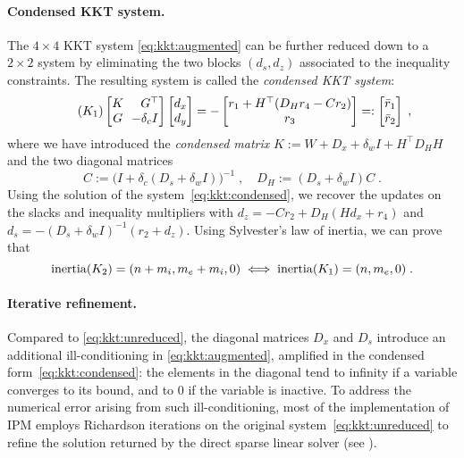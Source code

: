\paragraph{Condensed KKT system.}
The $4 \times 4$ KKT system \eqref{eq:kkt:augmented} can be further
reduced down to a $2 \times 2$ system by eliminating the two blocks
$(d_s, d_z)$ associated to the inequality constraints.
The resulting system is called the \emph{condensed KKT system}:
\begin{equation}
  \label{eq:kkt:condensed}
  \tag{$K_1$}
  \setlength\arraycolsep{3pt}
  \begin{bmatrix}
    K & \phantom{-} G^\top \\
    G & -\delta_c I
  \end{bmatrix}
  \begin{bmatrix}
    d_x \\ d_y
  \end{bmatrix}
  =
  -
  \begin{bmatrix}
    r_1 + H^\top(D_H r_4 - C r_2) \\ r_3
  \end{bmatrix}
  =:
  \begin{bmatrix}
    \bar{r}_1 \\ \bar{r}_2
  \end{bmatrix}
   \; ,
\end{equation}
where we have introduced the \emph{condensed matrix} $K := W + D_x + \delta_w I  + H^\top D_H H$
and the two diagonal matrices
\begin{equation}
  C := \big(I + \delta_c(D_s + \delta_w I)\big)^{-1} \; , \quad
  D_H := (D_s + \delta_w I) C \; .
\end{equation}
Using the solution of the system~\eqref{eq:kkt:condensed},
we recover the updates on the slacks and inequality multipliers with
$d_z = -C r_2 + D_H(H d_x + r_4)$ and $d_s = -(D_s + \delta_w I)^{-1}(r_2 + d_z)$.
Using Sylvester's law of inertia, we can prove that
\begin{equation}
  \label{eq:ipm:inertia}
  \operatorname{inertia}(K_2) = (n+m_i, m_e+m_i, 0) \iff
  \operatorname{inertia}(K_1) = (n, m_e, 0) \;.
\end{equation}

\paragraph{Iterative refinement.}
Compared to \eqref{eq:kkt:unreduced},
the diagonal matrices $D_x$ and $D_s$ introduce
an additional ill-conditioning in \eqref{eq:kkt:augmented}, amplified
in the condensed form~\eqref{eq:kkt:condensed}:
the elements in the diagonal tend to infinity if a variable converges to its bound,
and to $0$ if the variable is inactive.
To address the numerical error arising from such ill-conditioning, most of the
implementation of IPM employs Richardson iterations on the original system~\eqref{eq:kkt:unreduced} to refine the solution returned by the direct sparse linear solver (see \cite[Section 3.10]{wachter2006implementation}).


